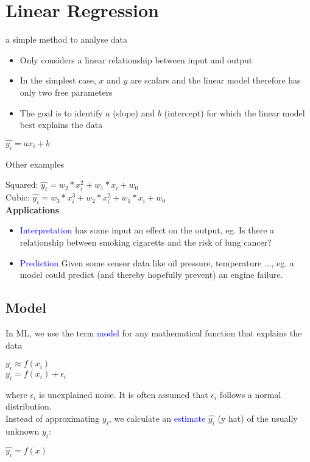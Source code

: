 \section{Linear Regression}
a simple method to analyse data \\

\begin{itemize}
    \item Only considers a linear relationship between input and output
    \item In the simplest case, $x$ and $y$ are scalars and the linear model therefore has only two free parameters
    \item The goal is to identify $a$ (slope) and $b$ (intercept) for which the linear model best explains the data
\end{itemize}
\begin{center}
    $\hat{y_i} = ax_i + b$
\end{center}

Other examples

Squared: $\hat{y_i} = w_2 * x_i^2 + w_1 * x_i + w_0$\\
Cubic: $\hat{y_i} = w_3 * x_i^3 + w_2 * x_i^2 + w_1 * x_i + w_0$\\

\textbf{Applications}
\begin{itemize}
    \item \textcolor{blue}{Interpretation} has some input an effect on the output, eg. Is there a relationship between smoking cigaretts and the risk of lung cancer?
    \item \textcolor{blue}{Prediction} Given some sensor data like oil pressure, temperature ..., eg. a model could predict (and thereby hopefully prevent) an engine failure.
\end{itemize}

\subsection{Model}
In ML, we use the term \textcolor{blue}{model} for any mathematical function that explains the data\\
\begin{center}
    $y_i \approx f(x_i)$\\
    $y_i = f(x_i) + \epsilon_i$\\
\end{center}
where $\epsilon_i$ is unexplained noise. It is often assumed that $\epsilon_i$ follows a normal distribution.\\
Instead of approximating $y_i$, we calculate an \textcolor{blue}{estimate} $\hat{y_i}$ (y hat) of the usually unknown $y_i$: \\
\begin{center}
    $\hat{y_i} = f(x)$
\end{center}



